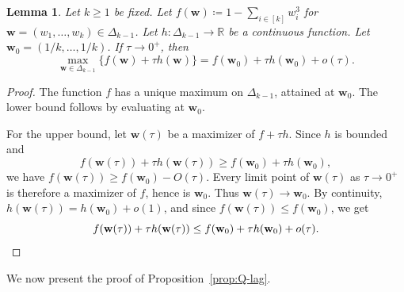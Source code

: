 \documentclass[10pt]{article}
\numberwithin{equation}{section}
\newtheorem{lemma}[theorem]{Lemma}
\newcommand{\R}{\mathbb{R}}
\begin{document}
\begin{lemma}\label{lem:perturb}
Let $k\ge 1$ be fixed. Let $f(\mathbf{w})\coloneqq 1-\sum_{i\in[k]} w_i^3$ for $\mathbf{w} = (w_1, \ldots, w_k) \in \Delta_{k-1}$. Let $h\colon\Delta_{k-1}\to\R$ be a continuous function. Let $\mathbf{w}_0=(1/k,\ldots,1/k)$. If $\tau\to 0^+$, then
\[
        \max_{\mathbf{w}\in\Delta_{k-1}}\{f(\mathbf{w})+\tau h(\mathbf{w})\} =f(\mathbf{w}_0)+\tau h(\mathbf{w}_0)+o(\tau).
\]
\end{lemma}

\begin{proof}
The function $f$ has a unique maximum on $\Delta_{k-1}$, attained at $\mathbf{w}_0$. The lower bound follows by evaluating at $\mathbf{w}_0$.

For the upper bound, let $\mathbf{w}(\tau)$ be a maximizer of $f+\tau h$. Since $h$ is bounded and
\[
        f(\mathbf{w}(\tau))+\tau h(\mathbf{w}(\tau))\ge f(\mathbf{w}_0)+\tau h(\mathbf{w}_0),
\]
we have $f(\mathbf{w}(\tau))\ge f(\mathbf{w}_0)-O(\tau)$. Every limit point of $\mathbf{w}(\tau)$ as $\tau\to 0^+$ is therefore a maximizer of $f$, hence is $\mathbf{w}_0$. Thus $\mathbf{w}(\tau)\to \mathbf{w}_0$. By continuity, $h(\mathbf{w}(\tau))=h(\mathbf{w}_0)+o(1)$, and since $f(\mathbf{w}(\tau))\le f(\mathbf{w}_0)$, we get
\[
        f(\mathbf{w}(\tau))+\tau h(\mathbf{w}(\tau))\le f(\mathbf{w}_0)+\tau h(\mathbf{w}_0)+o(\tau). \qedhere
\]
\end{proof}

\bigskip 

We now present the proof of Proposition~\ref{prop:Q-lag}. 
\end{document}
